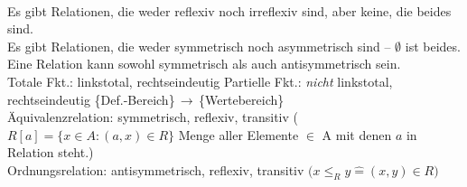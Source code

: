 \documentclass[a4paper,10pt,titlepage]{scrartcl}
\begin{document}
\smallskip\\
{\fontsize{9pt}{0pt}\selectfont
Es gibt Relationen, die weder reflexiv noch irreflexiv sind, aber keine, die beides sind.\\
Es gibt Relationen, die weder symmetrisch noch asymmetrisch sind -- $\emptyset$ ist beides.\\
Eine Relation kann sowohl symmetrisch als auch antisymmetrisch sein.
\smallskip\\
\noindent
Totale Fkt.: linkstotal, rechtseindeutig \qquad Partielle Fkt.: \emph{nicht} linkstotal, rechtseindeutig \qquad \{Def.-Bereich\}\,$\to$\,\{Wertebereich\}\\
Äquivalenzrelation: symmetrisch, reflexiv, transitiv ($R[a]=\lbrace x\in A : (a,x)\in R \rbrace$ {\fontsize{8pt}{0pt}\selectfont Menge aller Elemente $\in$ A mit denen $a$ in Relation steht.})\\
Ordnungsrelation: antisymmetrisch, reflexiv, transitiv $\bigl(x\leq_R y \mathrel{\widehat{=}} (x,y)\in R\bigr)$
}
\end{document}

